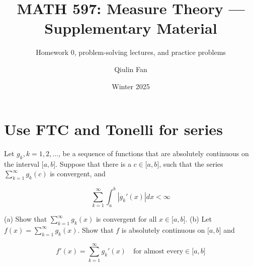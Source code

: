 \documentclass{qlnotes-export}
\title{MATH 597: Measure Theory --- Supplementary Material}
\subtitle{Homework 0, problem-solving lectures, and practice problems}
\author{Qiulin Fan}
\date{Winter 2025}
\begin{document}
\mainmatter
\chapter{Use FTC and Tonelli for series}\label{use-ftc-and-tonelli-for-series}

Let \(g_{k},k = 1,2,\ldots\), be a sequence of functions that are absolutely continuous on the interval \(\lbrack a,b\rbrack\). Suppose that there is a \(c \in \lbrack a,b\rbrack\), such that the series \(\sum_{k = 1}^{\infty}g_{k}(c)\) is convergent, and

\[\sum\limits_{k = 1}^{\infty}\int_{a}^{b}\left| {g_{k}'(x)} \right|dx < \infty\]

(a) Show that \(\sum_{k = 1}^{\infty}g_{k}(x)\) is convergent for all \(x \in \lbrack a,b\rbrack\). (b) Let \(f(x) = \sum_{k = 1}^{\infty}g_{k}(x)\). Show that \(f\) is absolutely continuous on \(\lbrack a,b\rbrack\) and

\[f'(x) = \sum\limits_{k = 1}^{\infty}g_{k}'(x)\quad\text{for almost every} \in \lbrack a,b\rbrack\]
\end{document}

